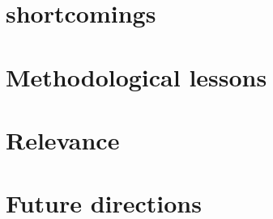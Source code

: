 \section{shortcomings}

\section{Methodological lessons}

\section{Relevance}

\section{Future directions}
% 

